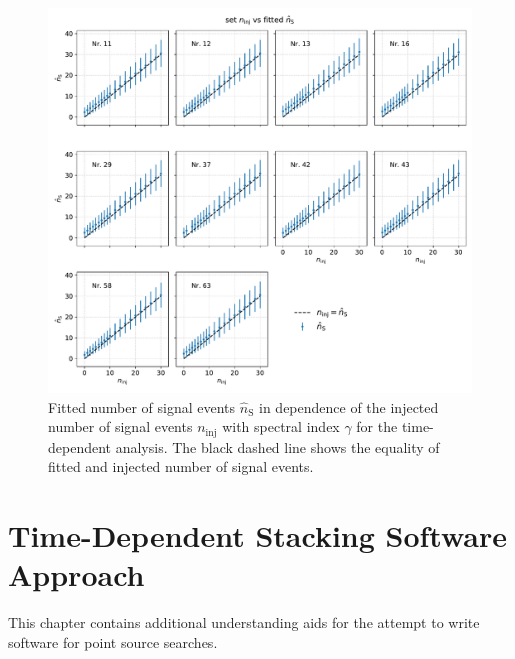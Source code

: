 \begin{figure}
    \centering
    \includegraphics[width=\linewidth]{Plots/appendix/ns_fit_time_dep.pdf}
    \caption{Fitted number of signal events $\hat{n}_{\text{S}}$ in dependence of the injected number of signal events $n_\text{inj}$ with spectral index $\gamma$ for the time-dependent analysis. The black dashed line shows the equality of fitted and injected number of signal events.}
    \label{fig:ns_fit_time_dep}
\end{figure}

\section{Time-Dependent Stacking Software Approach}

This chapter contains additional understanding aids for the attempt to write software for point source searches.

